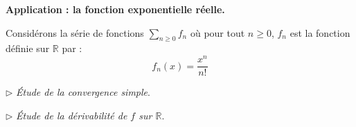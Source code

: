 \documentclass[french,11pt,twoside]{VcCours}
\begin{document}
\textbf{Application : la fonction exponentielle réelle.}

\medskip

Considérons la série de fonctions $\sum_{n \geq 0}f_n$ où pour tout $n \geq 0$, $f_n$ est la fonction définie sur $\mathbb{R}$ par :
$$ f_n (x) = \frac{x^n}{n!}$$

\medskip

$\rhd$ \emph{Étude de la convergence simple}. 

%

\vspace*{5cm}

\newpage

$\rhd$ \emph{Étude de la dérivabilité de $f$ sur $\mathbb{R}$}. 

%
%
%
\end{document}
